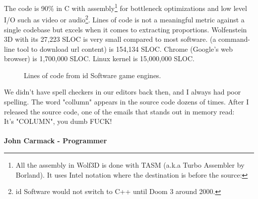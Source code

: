 \documentclass[book.tex]{subfiles}
\begin{document}
\par
 The code is 90\% in C with assembly\footnote{All the assembly in Wolf3D is done with TASM (a.k.a Turbo Assembler by Borland). It uses Intel notation where the destination is before the source:   } for bottleneck optimizations and low level I/O such as video or audio\footnote{id Software would not switch to C++ until Doom 3 around 2000.}. Lines of code is not a meaningful metric against a single codebase but excels when it comes to extracting proportions. Wolfenstein 3D with its 27,223 SLOC is very small compared to most software.  (a command-line tool to download url content) is 154,134 SLOC. Chrome (Google's web browser) is 1,700,000 SLOC. Linux kernel is 15,000,000 SLOC.\\
\par
\begin{figure}[H]
\centering
   \caption{Lines of code from id Software game engines.}
 \end{figure}
 
\par

 \begin{fancyquotes}
   We didn't have spell checkers in our editors back then, and I always had poor spelling.  The word "collumn" appears in the source code dozens of times.  After I released the source code, one of the emails that stands out in memory read:
 \bigskip \\
It's "COLUMN", you dumb FUCK!\\
 \bigskip \\
\textbf{John Carmack - Programmer}
 \end{fancyquotes}
 
\end{document}
